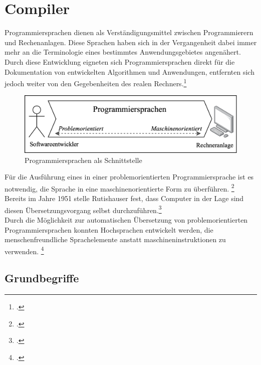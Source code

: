 \chapter{Compiler}


Programmiersprachen dienen als Verständigungsmittel zwischen Programmierern und Rechenanlagen. Diese Sprachen haben sich in der Vergangenheit dabei immer mehr an die  Terminologie eines bestimmtes Anwendungsgebietes angenähert. Durch diese Entwicklung eigneten sich Programmiersprachen direkt für die Dokumentation von entwickelten Algorithmen und Anwendungen, entfernten sich jedoch weiter von den Gegebenheiten des realen Rechners.\footcite[Vgl.][S. 15]{Schneider1975}
\begin{figure}[h]
 \includegraphics[width=\textwidth,height=\textheight,keepaspectratio]{Images/LanguageIntermediary.png}
 \caption{Programmiersprachen als Schnittstelle}
 \label{fig:Programmiersprachen als Schnittstelle}
\end{figure}
Für die Ausführung eines in einer problemorientierten Programmiersprache ist es notwendig, die Sprache in eine maschinenorientierte Form zu überführen. \footcite[Vgl.][S. 15]{Schneider1975} Bereits im Jahre 1951 stelle Rutishauser fest, dass Computer in der Lage sind diesen Übersetzungsvorgang selbst durchzuführen.\footcite[Vgl.][S. 1]{Quelle fehlt! improve https://link.springer.com/article/10.1007/BF02009622}  %
\\
Durch die Möglichkeit zur automatischen Übersetzung von problemorientierten Programmiersprachen konnten Hochsprachen entwickelt werden, die menschenfreundliche Sprachelemente anstatt maschineninstruktionen zu verwenden. \footcite[Vgl.][S. 47]{Wagenknecht2014}
\section{ Grundbegriffe}

